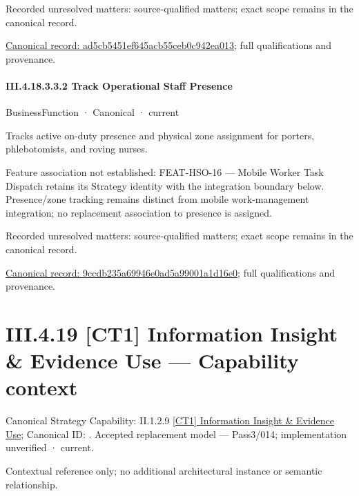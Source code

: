 {\small Recorded unresolved matters: source-qualified matters; exact scope remains in the canonical record.}\par
{\footnotesize \href{../../../../../../../../continuum/business/business-function/ad5cb5451ef645acb55ceb0c942ea013.md}{Canonical record: ad5cb5451ef645acb55ceb0c942ea013}; full qualifications and provenance.}\par
\paragraph*{III.4.18.3.3.2 Track Operational Staff Presence}
\label{navigation:III.4.18.3.3.2}

\label{element:9ccdb235a69946e0ad5a99001a1d16e0}
{\small BusinessFunction · Canonical · current}\par

Tracks active on-duty presence and physical zone assignment for porters, phlebotomists, and roving nurses.



Feature association not established: FEAT-HSO-16 — Mobile Worker Task Dispatch retains its Strategy identity with the integration boundary below. Presence/zone tracking remains distinct from mobile work-management integration; no replacement association to presence is assigned.


{\small Recorded unresolved matters: source-qualified matters; exact scope remains in the canonical record.}\par
{\footnotesize \href{../../../../../../../../continuum/business/business-function/9ccdb235a69946e0ad5a99001a1d16e0.md}{Canonical record: 9ccdb235a69946e0ad5a99001a1d16e0}; full qualifications and provenance.}\par
\section*{III.4.19 [CT1] Information Insight \& Evidence Use — Capability context}
\label{navigation:III.4.19}

{\small Canonical Strategy Capability: II.1.2.9 \hyperref[element:73b06d3d6f8f4dc0a7f9f7d500c0aed4]{[CT1] Information Insight \& Evidence Use}; Canonical ID: \texttt{}. Accepted replacement model — Pass3/014; implementation unverified · current.}\par
Contextual reference only; no additional architectural instance or semantic relationship.\par
